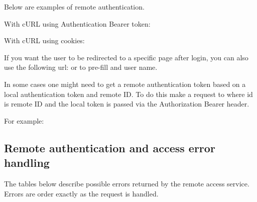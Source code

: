 Below are examples of remote authentication.

With cURL using Authentication Bearer token:
{\scriptsize
\begin{quote} 
\end{quote}
}

With cURL using cookies:
{\scriptsize
\begin{quote} 
\end{quote}
}

If you want the user to be redirected to a specific page after login, you can also use the following url:  or  to pre-fill \zwaydeviceid and user name.

In some cases one might need to get a remote authentication token based on a local authentication token and remote ID. To do this make a request to  where id is remote ID and the local token is passed via the Authorization Bearer header.

For example:
{\scriptsize
\begin{quote} 
\end{quote}
}

\subsection{Remote authentication and access error handling}
\label{cap:authentication_remote_errors}

The tables below describe possible errors returned by the remote access service. Errors are order exactly as the request is handled.

